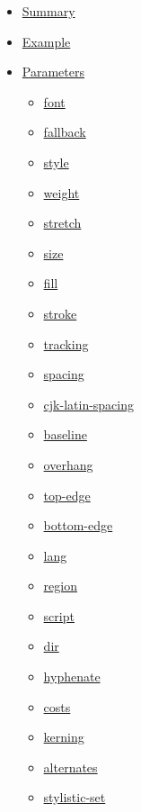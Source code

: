 \begin{itemize}
\tightlist
\item
  \hyperref[summary]{Summary}
\item
  \hyperref[example]{Example}
\item
  \hyperref[parameters]{Parameters}

  \begin{itemize}
  \tightlist
  \item
    \hyperref[parameters-font]{font}
  \item
    \hyperref[parameters-fallback]{fallback}
  \item
    \hyperref[parameters-style]{style}
  \item
    \hyperref[parameters-weight]{weight}
  \item
    \hyperref[parameters-stretch]{stretch}
  \item
    \hyperref[parameters-size]{size}
  \item
    \hyperref[parameters-fill]{fill}
  \item
    \hyperref[parameters-stroke]{stroke}
  \item
    \hyperref[parameters-tracking]{tracking}
  \item
    \hyperref[parameters-spacing]{spacing}
  \item
    \hyperref[parameters-cjk-latin-spacing]{cjk-latin-spacing}
  \item
    \hyperref[parameters-baseline]{baseline}
  \item
    \hyperref[parameters-overhang]{overhang}
  \item
    \hyperref[parameters-top-edge]{top-edge}
  \item
    \hyperref[parameters-bottom-edge]{bottom-edge}
  \item
    \hyperref[parameters-lang]{lang}
  \item
    \hyperref[parameters-region]{region}
  \item
    \hyperref[parameters-script]{script}
  \item
    \hyperref[parameters-dir]{dir}
  \item
    \hyperref[parameters-hyphenate]{hyphenate}
  \item
    \hyperref[parameters-costs]{costs}
  \item
    \hyperref[parameters-kerning]{kerning}
  \item
    \hyperref[parameters-alternates]{alternates}
  \item
    \hyperref[parameters-stylistic-set]{stylistic-set}

\end{itemize}
\end{itemize}
